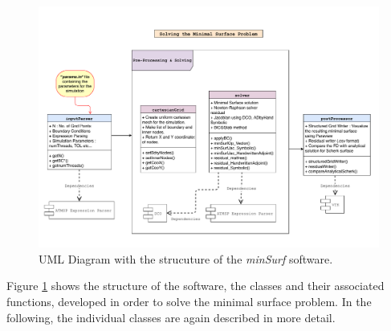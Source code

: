 \documentclass[11pt]{scrartcl}
\begin{document}
\begin{figure}[H]
	\includegraphics[width=\textwidth]{./figs/ReportUML.pdf}
	\caption{UML Diagram with the strucuture of the \textit{minSurf} software.}
	\label{fig:UMLDiag}
\end{figure}
\newpage
Figure \ref{fig:UMLDiag} shows the structure of the software, the classes and their associated functions, developed in order to solve the minimal surface problem. In the following, the individual classes are again described in more detail.
\end{document}

